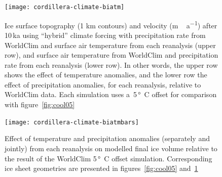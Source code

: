 \documentclass[tc, ms]{copernicus}
\begin{document}
\begin{figure}[t]
	\vspace*{2mm}
	\begin{center}
		\texttt{[image: cordillera-climate-biatm]}
	\end{center}
	\caption{Ice surface topography (1 km contours) and velocity (\unit{m\,a^{-1}}) after 10\,ka using “hybrid” climate forcing with precipitation rate from WorldClim and surface air temperature from each reanalysis (upper row), and surface air temperature from WorldClim and precipitation rate from each reanalysis (lower row). In other words, the upper row shows the effect of temperature anomalies, and the lower row the effect of precipitation anomalies, for each reanalysis, relative to WorldClim data. Each simulation uses a~5\,\unit{\degree C} offset for comparison with figure~\ref{fig:cool05}}
	\label{fig:biatm}
\end{figure}

\begin{figure}[t]
	\vspace*{2mm}
	\begin{center}
		\texttt{[image: cordillera-climate-biatmbars]}
	\end{center}
	\caption{Effect of temperature and precipitation anomalies (separately and jointly) from each reanalysis on modelled final ice volume relative to the result of the WorldClim 5\,\unit{\degree C} offset simulation. Corresponding ice sheet geometries are presented in figures~\ref{fig:cool05} and~\ref{fig:biatm}}
	\label{fig:biatmbars}
\end{figure}
\end{document}
